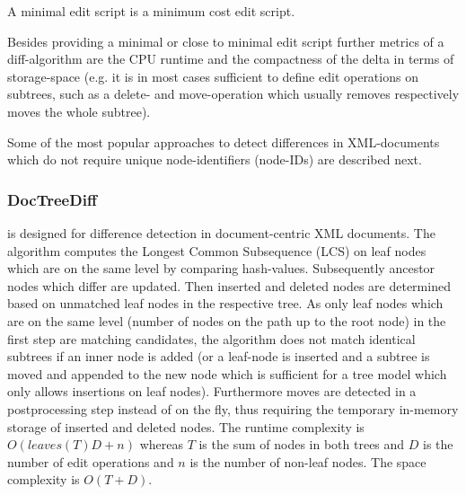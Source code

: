 \begin{mydef}
A minimal edit script is a minimum cost edit script.
\end{mydef}

Besides providing a minimal or close to minimal edit script further metrics of a diff-algorithm are the CPU runtime and the compactness of the delta in terms of storage-space (e.g. it is in most cases sufficient to define edit operations on subtrees, such as a delete- and move-operation which usually removes respectively moves the whole subtree).

Some of the most popular approaches to detect differences in XML-documents which do not require unique node-identifiers (node-IDs) are described next.

\subsubsection{DocTreeDiff\cite{ronnau2009efficient}}
is designed for difference detection in document-centric XML documents. The algorithm computes the Longest Common Subsequence (LCS) on leaf nodes which are on the same level by comparing hash-values. Subsequently ancestor nodes which differ are updated. Then inserted and deleted nodes are determined based on unmatched leaf nodes in the respective tree. As only leaf nodes which are on the same level (number of nodes on the path up to the root node) in the first step are matching candidates, the algorithm does not match identical subtrees if an inner node is added (or a leaf-node is inserted and a subtree is moved and appended to the new node which is sufficient for a tree model which only allows insertions on leaf nodes). Furthermore moves are detected in a postprocessing step instead of on the fly, thus requiring the temporary in-memory storage of inserted and deleted nodes. The runtime complexity is $O(leaves(T)D + n)$ whereas $T$ is the sum of nodes in both trees and $D$ is the number of edit operations and $n$ is the number of non-leaf nodes. The space complexity is $O(T+D)$.%


